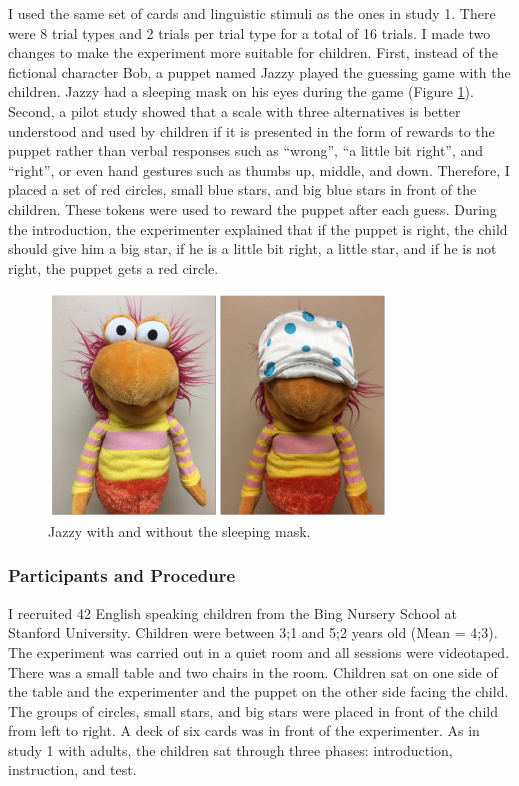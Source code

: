\documentclass[oneside]{report}
\theoremstyle{definition}
\theoremstyle{definition}
\theoremstyle{definition}
\theoremstyle{remark}
\begin{document}
I used the same set of cards and linguistic stimuli as the ones in study
1. There were 8 trial types and 2 trials per trial type for a total of
16 trials. I made two changes to make the experiment more suitable for
children. First, instead of the fictional character Bob, a puppet named
Jazzy played the guessing game with the children. Jazzy had a sleeping
mask on his eyes during the game (Figure \ref{fig:jazzy}). Second, a
pilot study showed that a scale with three alternatives is better
understood and used by children if it is presented in the form of
rewards to the puppet rather than verbal responses such as ``wrong'',
``a little bit right'', and ``right'', or even hand gestures such as
thumbs up, middle, and down. Therefore, I placed a set of red circles,
small blue stars, and big blue stars in front of the children. These
tokens were used to reward the puppet after each guess. During the
introduction, the experimenter explained that if the puppet is right,
the child should give him a big star, if he is a little bit right, a
little star, and if he is not right, the puppet gets a red circle.
\begin{figure}[tb]

{\centering \includegraphics{figs/jazzy-1} 

}

\caption{Jazzy with and without the sleeping mask.}\label{fig:jazzy}
\end{figure}
\subsubsection{Participants and
Procedure}\label{participants-and-procedure-1}

I recruited 42 English speaking children from the Bing Nursery School at
Stanford University. Children were between 3;1 and 5;2 years old (Mean =
4;3). The experiment was carried out in a quiet room and all sessions
were videotaped. There was a small table and two chairs in the room.
Children sat on one side of the table and the experimenter and the
puppet on the other side facing the child. The groups of circles, small
stars, and big stars were placed in front of the child from left to
right. A deck of six cards was in front of the experimenter. As in study
1 with adults, the children sat through three phases: introduction,
instruction, and test.
\end{document}

